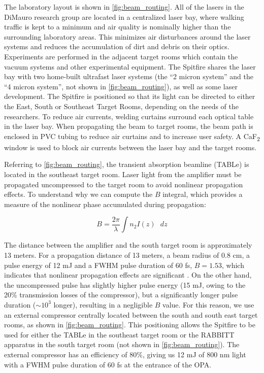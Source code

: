 The laboratory layout is shown in \cref{fig:beam_routing}. All of the lasers in the DiMauro research group are located in a centralized laser bay, where walking traffic is kept to a minimum and air quality is nominally higher than the surrounding laboratory areas. This minimizes air disturbances around the laser systems and reduces the accumulation of dirt and debris on their optics. Experiments are performed in the adjacent target rooms which contain the vacuum systems and other experimental equipment. The Spitfire shares the laser bay with two home-built ultrafast laser systems (the ``2 micron system'' and the ``4 micron system'', not shown in \cref{fig:beam_routing}), as well as some laser development. The Spitfire is positioned so that its light can be directed to either the East, South or Southeast Target Rooms, depending on the needs of the researchers. To reduce air currents, welding curtains surround each optical table in the laser bay. When propagating the beam to target rooms, the beam path is enclosed in PVC tubing to reduce air curtains and to increase user safety. A CaF\textsubscript{2} window is used to block air currents between the laser bay and the target rooms.

Referring to \cref{fig:beam_routing}, the transient absorption beamline (TABLe) is located in the southeast target room. Laser light from the amplifier must be propagated uncompressed to the target room to avoid nonlinear propagation effects. To understand why we can compute the $B$ integral, which provides a measure of the nonlinear phase accumulated during propagation: 

\begin{equation}
B = \frac{2 \pi}{\lambda} \int n_2 I(z) \text{ } dz
\label{eqn:B-integral}
\end{equation}

The distance between the amplifier and the south target room is approximately 13 meters. For a propagation distance of 13 meters, a beam radius of 0.8 cm, a pulse energy of 12 mJ and a FWHM pulse duration of 60 fs, $B = 1.53$, which indicates that nonlinear propagation effects are significant \cite{zahedpourMeasurementNonlinearRefractive2015}. On the other hand, the uncompressed pulse has slightly higher pulse energy (15 mJ, owing to the 20\% transmission losses of the compressor), but a significantly longer pulse duration ($\sim 10^3$ longer), resulting in a negligible $B$ value. For this reason, we use an external compressor centrally located between the south and south east target rooms, as shown in \cref{fig:beam_routing}. This positioning allows the Spitfire to be used for either the TABLe in the southeast target room or the RABBITT apparatus \cite{chirlaAttosecondPulseGeneration2011,gormanAttosecondProbingElectron2018,kiesewetterDynamicsNearThresholdAttosecond2019} in the south target room (not shown in \cref{fig:beam_routing}). The external compressor has an efficiency of 80\%, giving us 12 mJ of 800 nm light with a FWHM pulse duration of 60 fs at the entrance of the OPA.

